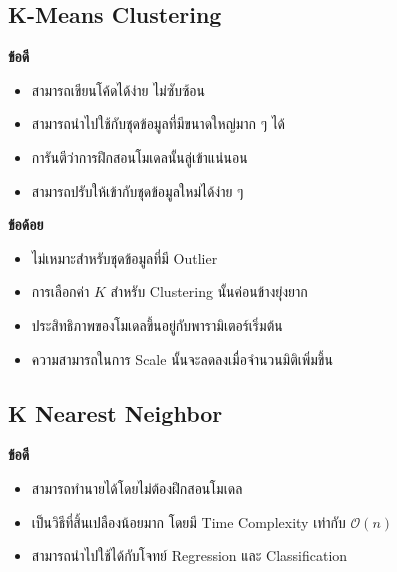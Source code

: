 \subsection{K-Means Clustering}
\label{ssec:pros_cons_kmeans}

\noindent \textbf{ข้อดี}
%
\begin{itemize}[topsep=0pt,noitemsep]\setlength\itemsep{0.5em}
    \item สามารถเขียนโค้ดได้ง่าย ไม่ซับซ้อน
    
    \item สามารถนำไปใช้กับชุดข้อมูลที่มีขนาดใหญ่มาก ๆ ได้
    
    \item การันตีว่าการฝึกสอนโมเดลนั้นลู่เข้าแน่นอน
    
    \item สามารถปรับให้เข้ากับชุดข้อมูลใหม่ได้ง่าย ๆ
\end{itemize}

\noindent \textbf{ข้อด้อย}
%
\begin{itemize}[topsep=0pt,noitemsep]\setlength\itemsep{0.5em}
    \item ไม่เหมาะสำหรับชุดข้อมูลที่มี Outlier
    
    \item การเลือกค่า $K$ สำหรับ Clustering นั้นค่อนข้างยุ่งยาก
    
    \item ประสิทธิภาพของโมเดลขึ้นอยู่กับพารามิเตอร์เริ่มต้น
    
    \item ความสามารถในการ Scale นั้นจะลดลงเมื่อจำนวนมิติเพิ่มขึ้น
\end{itemize}

\subsection{K Nearest Neighbor}
\label{ssec:pros_cons_knn}

\noindent \textbf{ข้อดี}
%
\begin{itemize}[topsep=0pt,noitemsep]\setlength\itemsep{0.5em}
    \item สามารถทำนายได้โดยไม่ต้องฝึกสอนโมเดล
    
    \item เป็นวิธีที่สิ้นเปลืองน้อยมาก โดยมี Time Complexity เท่ากับ $\mathcal{O}(n)$
    
    \item สามารถนำไปใช้ได้กับโจทย์ Regression และ Classification
\end{itemize}

